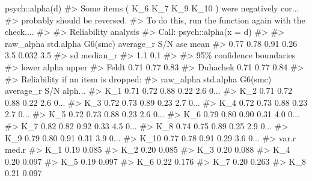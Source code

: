 \documentclass[
  letterpaper,
]{krantz}
\makeatletter
\newenvironment{Shaded}{\begin{snugshade}}{\end{snugshade}}
\newcommand{\CommentTok}[1]{\textcolor[rgb]{0.37,0.37,0.37}{#1}}
\newcommand{\FunctionTok}[1]{\textcolor[rgb]{0.28,0.35,0.67}{#1}}
\newcommand{\NormalTok}[1]{\textcolor[rgb]{0.00,0.23,0.31}{#1}}
\newcommand{\SpecialCharTok}[1]{\textcolor[rgb]{0.37,0.37,0.37}{#1}}
\newenvironment{kframe}{%
\medskip{}
\setlength{\fboxsep}{.8em}
 \def\at@end@of@kframe{}%
 \ifinner\ifhmode%
  \def\at@end@of@kframe{\end{minipage}}%
  \begin{minipage}{\columnwidth}%
 \fi\fi%
 \def\FrameCommand##1{\hskip\@totalleftmargin \hskip-\fboxsep
 \colorbox{shadecolor}{##1}\hskip-\fboxsep
     \hskip-\linewidth \hskip-\@totalleftmargin \hskip\columnwidth}%
 \MakeFramed {\advance\hsize-\width
   \@totalleftmargin\z@ \linewidth\hsize
   \@setminipage}}%
 {\par\unskip\endMakeFramed%
 \at@end@of@kframe}
\renewenvironment{Shaded}{\begin{kframe}}{\end{kframe}}
\makeatother
\begin{document}
\begin{Shaded}
\begin{Highlighting}[]
\NormalTok{psych}\SpecialCharTok{::}\FunctionTok{alpha}\NormalTok{(d)}
\CommentTok{\#\textgreater{} Some items ( K\_6 K\_7 K\_9 K\_10 ) were negatively cor...}
\CommentTok{\#\textgreater{} probably should be reversed.  }
\CommentTok{\#\textgreater{} To do this, run the function again with the \textquotesingle{}check....}
\CommentTok{\#\textgreater{} }
\CommentTok{\#\textgreater{} Reliability analysis   }
\CommentTok{\#\textgreater{} Call: psych::alpha(x = d)}
\CommentTok{\#\textgreater{} }
\CommentTok{\#\textgreater{}   raw\_alpha std.alpha G6(smc) average\_r S/N   ase mean}
\CommentTok{\#\textgreater{}       0.77      0.78    0.91      0.26 3.5 0.032  3.5}
\CommentTok{\#\textgreater{}   sd median\_r}
\CommentTok{\#\textgreater{}  1.1      0.1}
\CommentTok{\#\textgreater{} }
\CommentTok{\#\textgreater{}     95\% confidence boundaries }
\CommentTok{\#\textgreater{}          lower alpha upper}
\CommentTok{\#\textgreater{} Feldt     0.71  0.77  0.83}
\CommentTok{\#\textgreater{} Duhachek  0.71  0.77  0.84}
\CommentTok{\#\textgreater{} }
\CommentTok{\#\textgreater{}  Reliability if an item is dropped:}
\CommentTok{\#\textgreater{}      raw\_alpha std.alpha G6(smc) average\_r S/N alph...}
\CommentTok{\#\textgreater{} K\_1       0.71      0.72    0.88      0.22 2.6    0...}
\CommentTok{\#\textgreater{} K\_2       0.71      0.72    0.88      0.22 2.6    0...}
\CommentTok{\#\textgreater{} K\_3       0.72      0.73    0.89      0.23 2.7    0...}
\CommentTok{\#\textgreater{} K\_4       0.72      0.73    0.88      0.23 2.7    0...}
\CommentTok{\#\textgreater{} K\_5       0.72      0.73    0.88      0.23 2.6    0...}
\CommentTok{\#\textgreater{} K\_6       0.79      0.80    0.90      0.31 4.0    0...}
\CommentTok{\#\textgreater{} K\_7       0.82      0.82    0.92      0.33 4.5    0...}
\CommentTok{\#\textgreater{} K\_8       0.74      0.75    0.89      0.25 2.9    0...}
\CommentTok{\#\textgreater{} K\_9       0.79      0.80    0.91      0.31 3.9    0...}
\CommentTok{\#\textgreater{} K\_10      0.77      0.78    0.91      0.29 3.6    0...}
\CommentTok{\#\textgreater{}      var.r med.r}
\CommentTok{\#\textgreater{} K\_1   0.19 0.085}
\CommentTok{\#\textgreater{} K\_2   0.20 0.085}
\CommentTok{\#\textgreater{} K\_3   0.20 0.088}
\CommentTok{\#\textgreater{} K\_4   0.20 0.097}
\CommentTok{\#\textgreater{} K\_5   0.19 0.097}
\CommentTok{\#\textgreater{} K\_6   0.22 0.176}
\CommentTok{\#\textgreater{} K\_7   0.20 0.263}
\CommentTok{\#\textgreater{} K\_8   0.21 0.097}

\end{Highlighting}
\end{Shaded}
\end{document}
